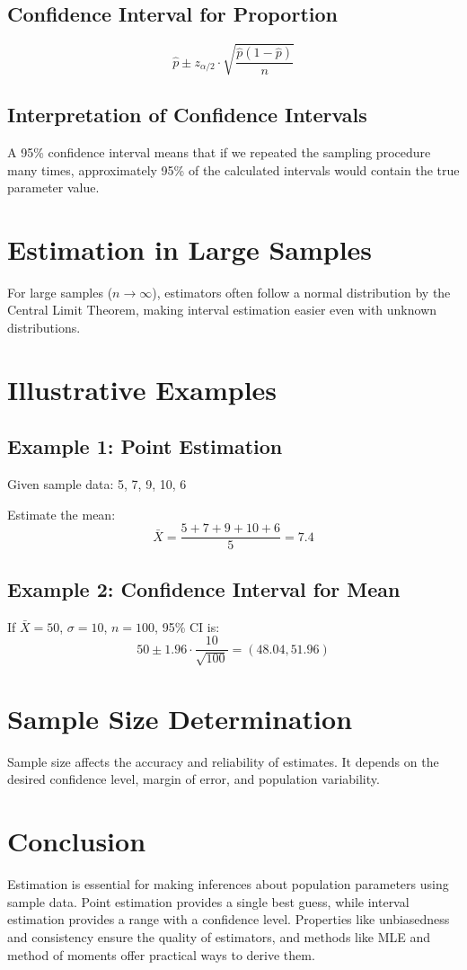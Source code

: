 \documentclass[twoside]{book}
\begin{document}
\subsection{Confidence Interval for Proportion}
\[
\hat{p} \pm z_{\alpha/2} \cdot \sqrt{\frac{\hat{p}(1 - \hat{p})}{n}}
\]

\subsection{Interpretation of Confidence Intervals}
A 95\% confidence interval means that if we repeated the sampling procedure many times, approximately 95\% of the calculated intervals would contain the true parameter value.

\section{Estimation in Large Samples}
For large samples (\( n \to \infty \)), estimators often follow a normal distribution by the Central Limit Theorem, making interval estimation easier even with unknown distributions.

\section{Illustrative Examples}
\subsection*{Example 1: Point Estimation}
Given sample data: 5, 7, 9, 10, 6

Estimate the mean:
\[
\bar{X} = \frac{5 + 7 + 9 + 10 + 6}{5} = 7.4
\]

\subsection*{Example 2: Confidence Interval for Mean}
If \( \bar{X} = 50 \), \( \sigma = 10 \), \( n = 100 \), 95\% CI is:
\[
50 \pm 1.96 \cdot \frac{10}{\sqrt{100}} = (48.04, 51.96)
\]


\section{Sample Size Determination}
Sample size affects the accuracy and reliability of estimates. It depends on the desired confidence level, margin of error, and population variability.



\section{Conclusion}
Estimation is essential for making inferences about population parameters using sample data. Point estimation provides a single best guess, while interval estimation provides a range with a confidence level. Properties like unbiasedness and consistency ensure the quality of estimators, and methods like MLE and method of moments offer practical ways to derive them.
\end{document}
